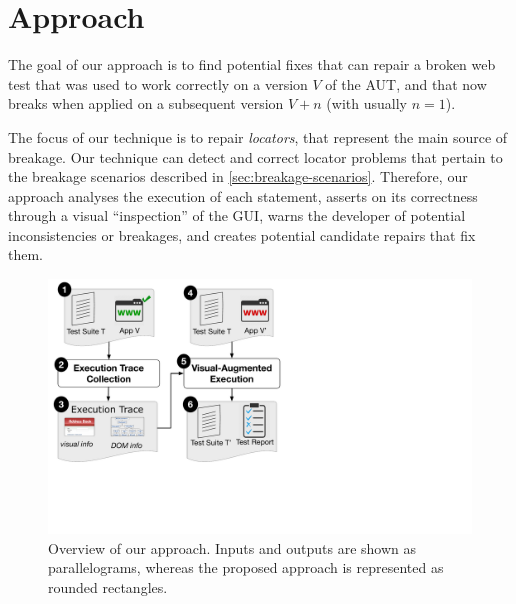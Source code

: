 \section{Approach}\label{sec:approach}

The goal of our approach is to find potential fixes that can repair a broken web test that was used to work correctly on a version $V$ of the AUT, and that now breaks when applied on a subsequent version $V+n$ (with usually $n=1$).

The focus of our technique is to repair \textit{locators}, that represent the main source of breakage.
Our technique can detect and correct locator problems that pertain to the breakage scenarios described in \autoref{sec:breakage-scenarios}.
Therefore, our approach analyses the execution of each statement,  asserts on its correctness through a visual ``inspection'' of the GUI, warns the developer of potential inconsistencies or breakages, and creates potential candidate repairs that fix them.

\begin{figure}[t]
\centering
\includegraphics[trim={0.2cm 6.5cm 17cm 0.2cm},clip,scale=0.26]{images/approach-bigger}
\caption{Overview of our approach. Inputs and outputs are shown as parallelograms, whereas the proposed approach is represented as rounded rectangles.}
\label{approach}
\end{figure}

